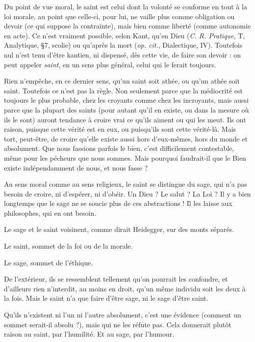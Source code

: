 Du point de vue moral, le saint est celui dont la volonté se conforme en
tout à la loi morale, au point que celle-ci, pour lui, ne vaille plus comme obligation
ou devoir (ce qui suppose la contrainte), mais bien comme liberté
(comme autonomie en acte). Ce n’est vraiment possible, selon Kant, qu’en
Dieu ({\it C. R. Pratique}, T, Analytique, \S 7, scolie) ou qu'après la mort ({\it op. cit.},
Dialectique, IV). Toutefois nul n’est tenu d’être kantien, ni dispensé, dès cette
vie, de faire son devoir : on peut appeler {\it saint}, en un sens plus général, celui qui
le ferait toujours.

Rien n'empêche, en ce dernier sens, qu’un saint soit athée, ou qu’un athée
soit saint. Toutefois ce n’est pas la règle. Non seulement parce que la médiocrité
est toujours le plus probable, chez les croyants comme chez les incroyants,
mais aussi parce que la plupart des saints (pour autant qu’il en existe, ou dans
la mesure où ils le sont) auront tendance à croire vrai ce qu’ils aiment ou qui
les meut. Ils ont raison, puisque cette vérité est en eux, ou puisqu'ils sont cette
vérité-là. Mais tort, peut-être, de croire qu’elle existe aussi hors d’eux-mêmes,
hors du monde et absolument. Que nous fassions parfois le bien, c’est difficilement
contestable, même pour les pécheurs que nous sommes. Mais pourquoi
faudrait-il que le Bien existe indépendamment de nous, et nous fasse ?

Au sens moral comme au sens religieux, le saint se distingue du sage, qui
n’a pas besoin de croire, ni d’espérer, ni d’obéir. Un Dieu ? Le salut ? La Loi ?
Il y a bien longtemps que le sage ne se soucie plus de ces abstractions ! Il les
laisse aux philosophes, qui en ont besoin.

Le sage et le saint voisinent, comme dirait Heidegger, sur des monts
séparés.

Le saint, sommet de la foi ou de la morale.

Le sage, sommet de l'éthique.

De l'extérieur, ils se ressemblent tellement qu’on pourrait les confondre, et
d’ailleurs rien n’interdit, au moins en droit, qu’un même individu soit les deux
à la fois. Mais le saint n’a que faire d’être sage, ni le sage d’être saint.

Qu'ils n'existent ni l’un ni l’autre absolument, c’est une évidence (comment
un sommet serait-il absolu ?), mais qui ne les réfute pas. Cela donnerait
plutôt raison au saint, par l'humilité. Et au sage, par l'humour.

